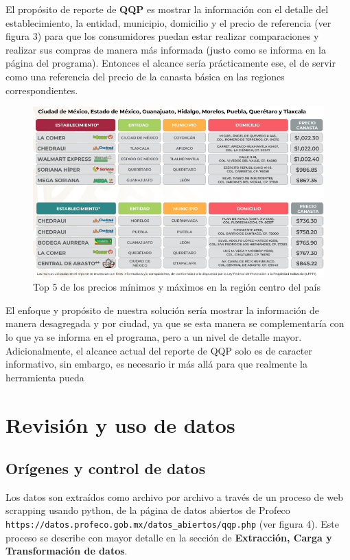 \documentclass{article}
\begin{document}
El propósito de reporte de \textbf{QQP} es mostrar la información con el detalle del establecimiento, la entidad, municipio, domicilio y el precio de referencia (ver figura 3) para que los consumidores puedan estar realizar comparaciones y realizar sus compras de manera más informada (justo como se informa en la página del programa). Entonces el alcance sería prácticamente ese, el de servir como una referencia del precio de la canasta básica en las regiones correspondientes. 

\begin{figure}[h]
\centering
\includegraphics[width=0.9\linewidth]{images/Top 5.png}
\caption{\label{fig:Canasta}Top 5 de los precios mínimos y máximos en la región centro del país}
\end{figure}

El enfoque y propósito de nuestra solución sería mostrar la información de manera desagregada y por ciudad, ya que se esta manera se complementaría con lo que ya se informa en el programa, pero a un nivel de detalle mayor. Adicionalmente, el alcance actual del reporte de QQP solo es de caracter informativo, sin embargo, es necesario ir más allá para que realmente la herramienta pueda 

\newpage
\section{Revisión y uso de datos}

\subsection{Orígenes y control de datos}

Los datos son extraídos como archivo por archivo a través de un proceso de web scrapping usando python, de la página de datos abiertos de Profeco \verb|https://datos.profeco.gob.mx/datos_abiertos/qqp.php| (ver figura 4). Este proceso se describe con mayor detalle en la sección de \textbf{Extracción, Carga y Transformación de datos}. 
\end{document}
